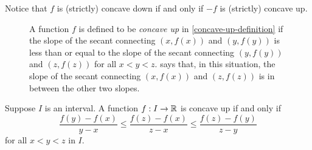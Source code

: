 Notice that $f$ is (strictly) concave down if and only if $-f$ is (strictly) concave up. 

\begin{figure}[t]
	\begin{center}
	\end{center}
	\caption{A function $f$ is defined to be \emph{concave up} in \cref{concave-up-definition} if the slope of the secant connecting $(x,f(x))$ and $(y,f(y))$ is less than or equal to the slope of the secant connecting $(y,f(y))$ and $(z,f(z))$ for all $x < y < z$.  says that, in this situation, the slope of the secant connecting $(x,f(x))$ and $(z,f(z))$ is in between the other two slopes. }  \label{concave-up-picture}
\end{figure}

\begin{lemma} \label{concave-up-reformulation}
	Suppose $I$ is an interval. A function $f : I \to \mathbb{R}$ is concave up if and only if 
	\[ \frac{f(y)-f(x)}{y-x} \leq \frac{f(z)-f(x)}{z-x} \leq \frac{f(z)-f(y)}{z-y} \]
	for all $x < y < z$ in $I$. 
\end{lemma}

